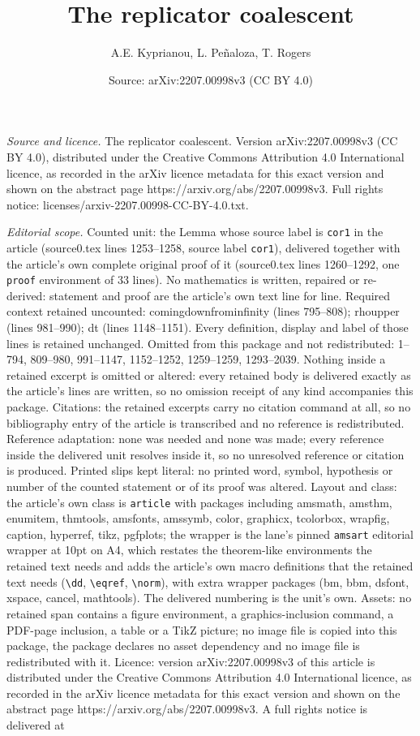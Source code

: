 \documentclass[10pt,a4paper]{amsart}
\title[The replicator coalescent]{The replicator coalescent}
\author{A.E. Kyprianou, L. Pe\~naloza, T. Rogers}
\date{Source: arXiv:2207.00998v3 (CC BY 4.0)}
\begin{document}
\maketitle

\noindent\emph{Source and licence.} The replicator coalescent. Version arXiv:2207.00998v3 (CC BY 4.0), distributed under the Creative Commons Attribution 4.0 International licence, as recorded in the arXiv licence metadata for this exact version and shown on the abstract page https://arxiv.org/abs/2207.00998v3. Full rights notice: licenses/arxiv-2207.00998-CC-BY-4.0.txt.\par\smallskip

\noindent\textit{Editorial scope.} Counted unit: the Lemma whose source label is \texttt{cor1} in the article (source0.tex lines 1253--1258, source label \texttt{cor1}), delivered together with the article's own complete original proof of it (source0.tex lines 1260--1292, one \texttt{proof} environment of 33 lines). No mathematics is written, repaired or re-derived: statement and proof are the article's own text line for line. Required context retained uncounted: comingdownfrominfinity (lines 795--808); rhoupper (lines 981--990); dt (lines 1148--1151). Every definition, display and label of those lines is retained unchanged. Omitted from this package and not redistributed: 1--794, 809--980, 991--1147, 1152--1252, 1259--1259, 1293--2039. Nothing inside a retained excerpt is omitted or altered: every retained body is delivered exactly as the article's lines are written, so no omission receipt of any kind accompanies this package. Citations: the retained excerpts carry no citation command at all, so no bibliography entry of the article is transcribed and no reference is redistributed. Reference adaptation: none was needed and none was made; every reference inside the delivered unit resolves inside it, so no unresolved reference or citation is produced. Printed slips kept literal: no printed word, symbol, hypothesis or number of the counted statement or of its proof was altered. Layout and class: the article's own class is \texttt{article} with packages including amsmath, amsthm, enumitem, thmtools, amsfonts, amssymb, color, graphicx, tcolorbox, wrapfig, caption, hyperref, tikz, pgfplots; the wrapper is the lane's pinned \texttt{amsart} editorial wrapper at 10pt on A4, which restates the theorem-like environments the retained text needs and adds the article's own macro definitions that the retained text needs (\texttt{\textbackslash dd}, \texttt{\textbackslash eqref}, \texttt{\textbackslash norm}), with extra wrapper packages (bm, bbm, dsfont, xspace, cancel, mathtools). The delivered numbering is the unit's own. Assets: no retained span contains a figure environment, a graphics-inclusion command, a PDF-page inclusion, a table or a TikZ picture; no image file is copied into this package, the package declares no asset dependency and no image file is redistributed with it. Licence: version arXiv:2207.00998v3 of this article is distributed under the Creative Commons Attribution 4.0 International licence, as recorded in the arXiv licence metadata for this exact version and shown on the abstract page https://arxiv.org/abs/2207.00998v3. A full rights notice is delivered at 
\end{document}
